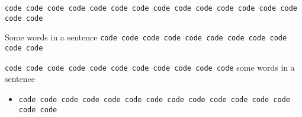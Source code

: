 


\verb|code code code code code code code code code code code code code code code code|


Some words in a sentence
\verb|code code code code code code code code code code code|

\verb|code code code code code code code code code code code| some
words in a sentence


\begin{itemize}
  \item
    \verb|code code code code code code code code code code code code code code code|
\end{itemize}


